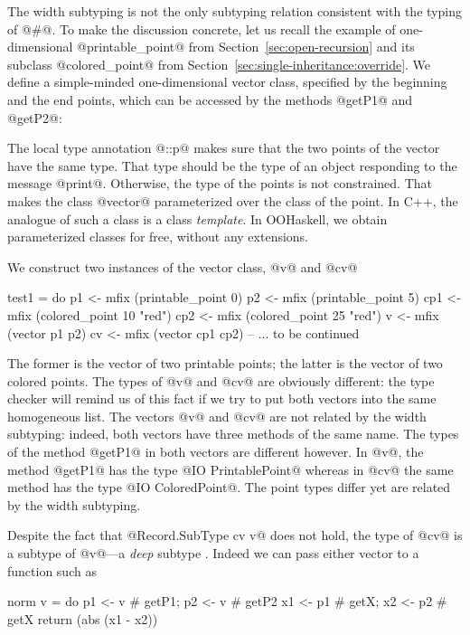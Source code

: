 \documentclass{jfp}
\begin{document}
The width subtyping is not the only subtyping relation consistent with
the typing of @#@. To make the discussion concrete, let us recall
the example of one-dimensional 
@printable_point@ from Section~\ref{sec:open-recursion} and its
subclass @colored_point@ from
Section~\ref{sec:single-inheritance:override}. We define a
simple-minded one-dimensional vector class, specified by the beginning
and the end points, which can be accessed by the methods @getP1@ and
@getP2@:

The local type annotation @::p@ makes sure that the two points of the
vector have the same type. That type should be the type of an object
responding to the message @print@. Otherwise, the type of the points
is not constrained. That makes the class @vector@ parameterized over
the class of the point. In C++, the analogue of such a class is a 
class \emph{template}. In OOHaskell, we obtain parameterized classes
for free, without any extensions.

We construct two instances of the vector class, @v@ and @cv@
\begin{code}
test1 = do
	p1  <- mfix (printable_point 0)
	p2  <- mfix (printable_point 5)
	cp1 <- mfix (colored_point 10 "red")
	cp2 <- mfix (colored_point 25 "red")
	v  <- mfix (vector p1 p2)
	cv <- mfix (vector cp1 cp2)
	-- ... to be continued
\end{code}
The former is the vector of two printable points; the latter is the
vector of two colored points. The types of @v@ and @cv@ are
obviously different: the type checker will remind us of this fact 
if we try to put both vectors into the same homogeneous list. The
vectors @v@ and @cv@ are not related by the width subtyping: indeed,
both vectors have three methods of the same name. The types of the
method @getP1@ in both vectors are different however. In @v@, the
method @getP1@ has the type @IO PrintablePoint@ whereas in @cv@
the same method has the type @IO ColoredPoint@. The point types 
differ yet are related by the width subtyping.

Despite the fact that @Record.SubType cv v@ does not hold, the type
of @cv@ is a subtype of @v@---a \emph{deep} subtype \cite{Poll97}.
Indeed we can pass either vector to a function such as
\begin{code}
norm v =
    do
    p1 <- v # getP1; p2 <- v  # getP2
    x1 <- p1 # getX; x2 <- p2 # getX
    return (abs (x1 - x2))
\end{code}
\end{document}
